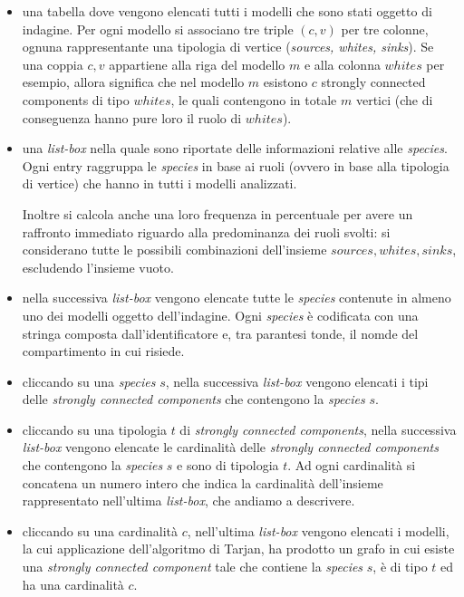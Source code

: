 \begin{itemize}
\item una tabella dove vengono elencati tutti i modelli che sono stati
  oggetto di indagine. Per ogni modello si associano tre triple $(c,
  v)$ per tre colonne, ognuna rappresentante una tipologia di vertice
  (\emph{sources, whites, sinks}). Se una coppia $c, v$ appartiene
  alla riga del modello $m$ e alla colonna $whites$ per esempio,
  allora significa che nel modello $m$ esistono $c$ strongly connected
  components di tipo $whites$, le quali contengono in totale $m$
  vertici (che di conseguenza hanno pure loro il ruolo di $whites$).
\item una \emph{list-box} nella quale sono riportate delle
  informazioni relative alle \emph{species}. Ogni entry raggruppa le
  \emph{species} in base ai ruoli (ovvero in base alla tipologia di
  vertice) che hanno in tutti i modelli analizzati. 

  Inoltre si calcola anche una loro frequenza in percentuale per avere
  un raffronto immediato riguardo alla predominanza dei ruoli svolti:
  si considerano tutte le possibili combinazioni dell'insieme
  ${sources, whites, sinks}$, escludendo l'insieme vuoto.
\item nella successiva \emph{list-box} vengono elencate tutte le
  \emph{species} contenute in almeno uno dei modelli oggetto
  dell'indagine. Ogni \emph{species} \`e codificata con una stringa
  composta dall'identificatore e, tra parantesi tonde, il nomde del
  compartimento in cui risiede.
\item cliccando su una \emph{species} $s$, nella successiva
  \emph{list-box} vengono elencati i tipi delle \emph{strongly
    connected components} che contengono la \emph{species} $s$.
\item cliccando su una tipologia $t$ di \emph{strongly connected
    components}, nella successiva \emph{list-box} vengono elencate le
  cardinalit\`a delle \emph{strongly connected components} che
  contengono la \emph{species} $s$ e sono di tipologia $t$. Ad ogni
  cardinalit\`a si concatena un numero intero che indica la
  cardinalit\`a dell'insieme rappresentato nell'ultima
  \emph{list-box}, che andiamo a descrivere.
\item cliccando su una cardinalit\`a $c$, nell'ultima \emph{list-box}
  vengono elencati i modelli, la cui applicazione dell'algoritmo di
  Tarjan, ha prodotto un grafo in cui esiste una \emph{strongly
    connected component} tale che contiene la \emph{species} $s$, \`e
  di tipo $t$ ed ha una cardinalit\`a $c$.
\end{itemize}

